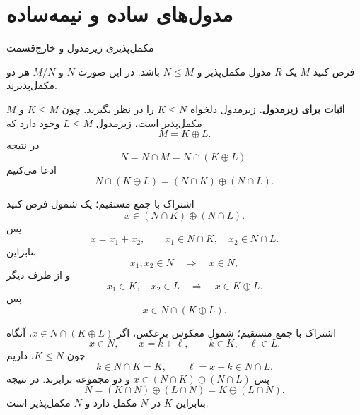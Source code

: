 \section{مدول‌های ساده و نیمه‌ساده}

\begin{frame}[t]{مکمل‌پذیری زیرمدول و خارج‌قسمت}
    \label{lec06:complemented-submodule-quotient}
    \begin{theorem}
        فرض کنید \(M\) یک \(R\)-مدول مکمل‌پذیر و \(N\leqslant M\) باشد.
        در این صورت \(N\) و \(M/N\) هر دو مکمل‌پذیرند.
    \end{theorem}
    \textbf{اثبات برای زیرمدول.}
    زیرمدول دلخواه \(K\leqslant N\) را در نظر بگیرید.
    چون \(K\leqslant M\) و \(M\) مکمل‌پذیر است، زیرمدول \(L\leqslant M\) وجود دارد که
    \[
        M=K\oplus L.
    \]
    در نتیجه
    \[
        N=N\cap M=N\cap(K\oplus L).
    \]
    ادعا می‌کنیم
    \[
        N\cap(K\oplus L)=(N\cap K)\oplus(N\cap L).
    \]
\end{frame}

\begin{frame}[t]{اشتراک با جمع مستقیم؛ یک شمول}
    \label{lec06:intersection-forward}
    فرض کنید
    \[
        x\in(N\cap K)\oplus(N\cap L).
    \]
    پس
    \[
        x=x_1+x_2,\qquad x_1\in N\cap K,\quad x_2\in N\cap L.
    \]
    بنابراین
    \[
        x_1,x_2\in N\quad\Longrightarrow\quad x\in N,
    \]
    و از طرف دیگر
    \[
        x_1\in K,\quad x_2\in L\quad\Longrightarrow\quad x\in K\oplus L.
    \]
    پس
    \[
        x\in N\cap(K\oplus L).
    \]
\end{frame}

\begin{frame}[t]{اشتراک با جمع مستقیم؛ شمول معکوس}
    \label{lec06:intersection-reverse}
    برعکس، اگر \(x\in N\cap(K\oplus L)\)، آنگاه
    \[
        x\in N,\qquad x=k+\ell,\qquad k\in K,\quad\ell\in L.
    \]
    چون \(K\leqslant N\)، داریم
    \[
        k\in N\cap K=K,\qquad \ell=x-k\in N\cap L.
    \]
    پس \(x\in(N\cap K)\oplus(N\cap L)\) و دو مجموعه برابرند.
    در نتیجه
    \[
        N=(K\cap N)\oplus(L\cap N)=K\oplus(L\cap N).
    \]
    بنابراین \(K\) در \(N\) مکمل دارد و \(N\) مکمل‌پذیر است.
\end{frame}

